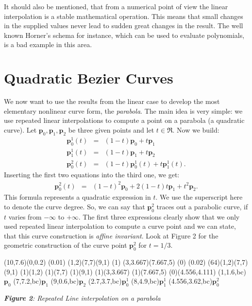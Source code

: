 \documentclass[titlepage,a4paper,11pt]{report}
\def\it{\textit}
\def\bf{\textbf}
\def\mb{\mathbf}
\begin{document}
It should also be mentioned, that from a numerical point of view the linear
interpolation is a stable mathematical operation. This means that small changes
in the supplied values never lead to sudden great changes in the result. The well
known Horner's schema for instance, which can be used to evaluate polynomials,
is a bad example in this area.

\section{Quadratic Bezier Curves}
We now want to use the results from the linear case to develop the
most elementary nonlinear curve form, the \it{parabola}. The main idea
is very simple: we use repeated linear interpolations to compute a point
on a parabola (a quadratic curve). Let $\mb{p}_0,\mb{p}_1,\mb{p}_2$ be
three given points and let $t\in \mb{\Re}$. Now we build:
\begin{eqnarray*}
  \mb{p}_0^1(t) & = & (1-t)\mb{p}_0+t\mb{p}_1 \\
  \mb{p}_1^1(t) & = & (1-t)\mb{p}_1+t\mb{p}_2 \\
  \mb{p}_0^2(t) & = & (1-t)\mb{p}_0^1(t)+t\mb{p}_1^1(t).
\end{eqnarray*}
Inserting the first two equations into the third one, we get:
\begin{eqnarray}
  \mb{p}_0^2(t) & = & (1-t)^2\mb{p}_0+2(1-t)t\mb{p}_1+t^2\mb{p}_2.
\end{eqnarray}
This formula represents a quadratic expression in $t$. We use the
superscript here to denote the curve degree. So, we can say that
$\mb{p}_0^2$ traces out a parabolic curve, if $t$ varies from $-\infty$
to $+\infty$. The first three expressions clearly show that we only used
repeated linear interpolation to compute a curve point and we can state,
that this curve construction is \it{affine invariant}. Look at Figure 2
for the geometric construction of the curve point $\mb{p}_0^2$ for $t=1/3$.
\begin{center}
\begin{lapdf}(10,7.6)(0,0.2)
  \Setwidth(0.01)
  \Black
  \Polygon(1,2)(7,7)(9,1) \Stroke
  \Dash(1)
  \Line(3,3.667)(7.667,5) \Stroke
  \Dash(0)
  \Setwidth(0.02)
  \Red
  \Curve(64)(1,2)(7,7)(9,1) \Stroke
  \Point(1)(1,2)
  \Point(1)(7,7)
  \Point(1)(9,1)
  \Point(1)(3,3.667)
  \Point(1)(7.667,5)
  \Point(0)(4.556,4.111)
  \Text(1,1.6,bc){$\mb{p}_0$}
  \Text(7,7.2,bc){$\mb{p}_1$}
  \Text(9,0.6,bc){$\mb{p}_2$}
  \Text(2.7,3.7,bc){$\mb{p}_0^1$}
  \Text(8,4.9,bc){$\mb{p}_1^1$}
  \Text(4.556,3.62,bc){$\mb{p}_0^2$}
\end{lapdf}

\it{\bf{Figure 2}: Repeated Line interpolation on a parabola}
\end{center}
\end{document}
